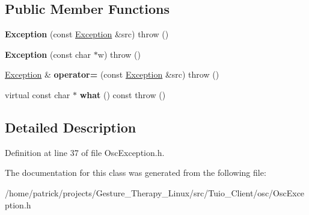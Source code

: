 \subsection*{Public Member Functions}
\begin{DoxyCompactItemize}
\item 
\mbox{\label{classosc_1_1_exception_a795fe30eb6e7e6f2851250a8752ac84b}} 
{\bfseries Exception} (const \hyperlink{classosc_1_1_exception}{Exception} \&src)  throw ()
\item 
\mbox{\label{classosc_1_1_exception_a28ee40481433317d30584048b9675714}} 
{\bfseries Exception} (const char $\ast$w)  throw ()
\item 
\mbox{\label{classosc_1_1_exception_af2269bf7a83116060d025d295f21e1e9}} 
\hyperlink{classosc_1_1_exception}{Exception} \& {\bfseries operator=} (const \hyperlink{classosc_1_1_exception}{Exception} \&src)  throw ()
\item 
\mbox{\label{classosc_1_1_exception_a868876a55d2350def4ba9c314168fca3}} 
virtual const char $\ast$ {\bfseries what} () const  throw ()
\end{DoxyCompactItemize}


\subsection{Detailed Description}


Definition at line 37 of file Osc\+Exception.\+h.



The documentation for this class was generated from the following file\+:\begin{DoxyCompactItemize}
\item 
/home/patrick/projects/\+Gesture\+\_\+\+Therapy\+\_\+\+Linux/src/\+Tuio\+\_\+\+Client/osc/Osc\+Exception.\+h\end{DoxyCompactItemize}
